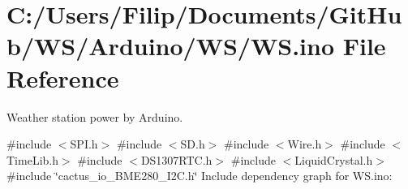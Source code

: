 \hypertarget{_w_s_8ino}{}\section{C\+:/\+Users/\+Filip/\+Documents/\+Git\+Hub/\+W\+S/\+Arduino/\+W\+S/\+WS.ino File Reference}
\label{_w_s_8ino}


Weather station power by Arduino.  


{\ttfamily \#include $<$S\+P\+I.\+h$>$}\newline
{\ttfamily \#include $<$S\+D.\+h$>$}\newline
{\ttfamily \#include $<$Wire.\+h$>$}\newline
{\ttfamily \#include $<$Time\+Lib.\+h$>$}\newline
{\ttfamily \#include $<$D\+S1307\+R\+T\+C.\+h$>$}\newline
{\ttfamily \#include $<$Liquid\+Crystal.\+h$>$}\newline
{\ttfamily \#include \char`\"{}cactus\+\_\+io\+\_\+\+B\+M\+E280\+\_\+\+I2\+C.\+h\char`\"{}}\newline
Include dependency graph for W\+S.\+ino\+:
